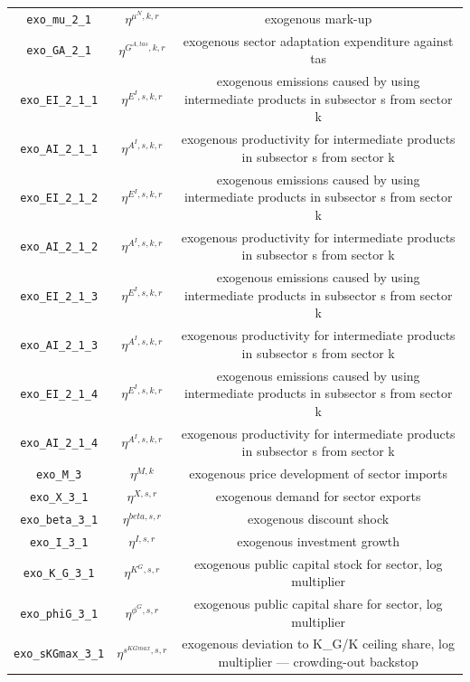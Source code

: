 \begin{center}
\begin{longtable}{ccc}
\texttt{exo\_mu\_2\_1} & ${\eta^{\mu^{N},k,r}}$ & exogenous mark-up\\
\texttt{exo\_GA\_2\_1} & ${\eta^{G^{A,tas},k,r}}$ & exogenous sector adaptation expenditure against tas\\
\texttt{exo\_EI\_2\_1\_1} & ${\eta^{E^{I},s,k,r}}$ & exogenous emissions caused by using intermediate products in subsector s from sector k\\
\texttt{exo\_AI\_2\_1\_1} & ${\eta^{A^{I},s,k,r}}$ & exogenous productivity for intermediate products in subsector s from sector k\\
\texttt{exo\_EI\_2\_1\_2} & ${\eta^{E^{I},s,k,r}}$ & exogenous emissions caused by using intermediate products in subsector s from sector k\\
\texttt{exo\_AI\_2\_1\_2} & ${\eta^{A^{I},s,k,r}}$ & exogenous productivity for intermediate products in subsector s from sector k\\
\texttt{exo\_EI\_2\_1\_3} & ${\eta^{E^{I},s,k,r}}$ & exogenous emissions caused by using intermediate products in subsector s from sector k\\
\texttt{exo\_AI\_2\_1\_3} & ${\eta^{A^{I},s,k,r}}$ & exogenous productivity for intermediate products in subsector s from sector k\\
\texttt{exo\_EI\_2\_1\_4} & ${\eta^{E^{I},s,k,r}}$ & exogenous emissions caused by using intermediate products in subsector s from sector k\\
\texttt{exo\_AI\_2\_1\_4} & ${\eta^{A^{I},s,k,r}}$ & exogenous productivity for intermediate products in subsector s from sector k\\
\texttt{exo\_M\_3} & ${\eta^{M,k}}$ & exogenous price development of sector imports\\
\texttt{exo\_X\_3\_1} & ${\eta^{X,s,r}}$ & exogenous demand for sector exports\\
\texttt{exo\_beta\_3\_1} & ${\eta^{beta,s,r}}$ & exogenous discount shock\\
\texttt{exo\_I\_3\_1} & ${\eta^{I,s,r}}$ & exogenous investment growth\\
\texttt{exo\_K\_G\_3\_1} & ${\eta^{K^G,s,r}}$ & exogenous public capital stock for sector, log multiplier\\
\texttt{exo\_phiG\_3\_1} & ${\eta^{\phi^{G},s,r}}$ & exogenous public capital share for sector, log multiplier\\
\texttt{exo\_sKGmax\_3\_1} & ${\eta^{s^{KGmax},s,r}}$ & exogenous deviation to K\_G/K ceiling share, log multiplier — crowding-out backstop\\

\end{longtable}
\end{center}
